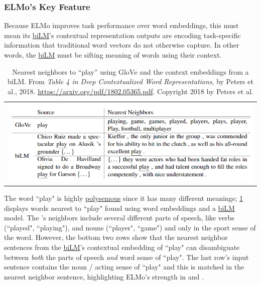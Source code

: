\subsubsection{ELMo's Key Feature} \label{sec:ELMoKeyFeature}

Because ELMo improves task performance over word embeddings, this must mean its \hyperref[sec:BidirectionalLM]{biLM}'s contextual representation outputs are encoding task-specific information that traditional word vectors do not otherwise capture. In other words, the \hyperref[sec:BidirectionalLM]{biLM} must be sifting meaning of words using their context.\newline  


\begin{table}[ht!]
  \centering
  \begin{tabular}{ c }
    
    \begin{minipage}{.8\textwidth}
      \includegraphics[width=\linewidth]{imgs/table_elmoPlay.png}
    \end{minipage}
    
  \end{tabular}
  \caption{\footnotesize Nearest neighbors to ``play” using GloVe and the context embeddings from a biLM. From \emph{Table 4 in Deep Contextualized Word Representations}, by Peters et al., 2018. \url{https://arxiv.org/pdf/1802.05365.pdf}. Copyright 2018 by Peters et al.}
  \label{tbl:elmoPlayExample}
\end{table}


The word ``play" is highly \hyperref[sec:PolysemyAgainInElmo]{polysemous} since it has many different meanings;  \cref{tbl:elmoPlayExample} displays words nearest to ``play" found using  word embeddings and a \hyperref[sec:BidirectionalLM]{biLM} model. The 's neighbors include several different parts of speech, like verbs (``played", ``playing"), and nouns (``player", ``game") and only in the sport sense of the word. However, the bottom two rows show that the nearest neighbor sentences from the \hyperref[sec:BidirectionalLM]{biLM}'s contextual embedding of ``play" can disambiguate between \emph{both} the parts of speech \emph{and} word sense of ``play". The last row's input sentence contains the noun / acting sense of ``play" and this is matched in the nearest neighbor sentence, highlighting ELMo's strength in  and . 